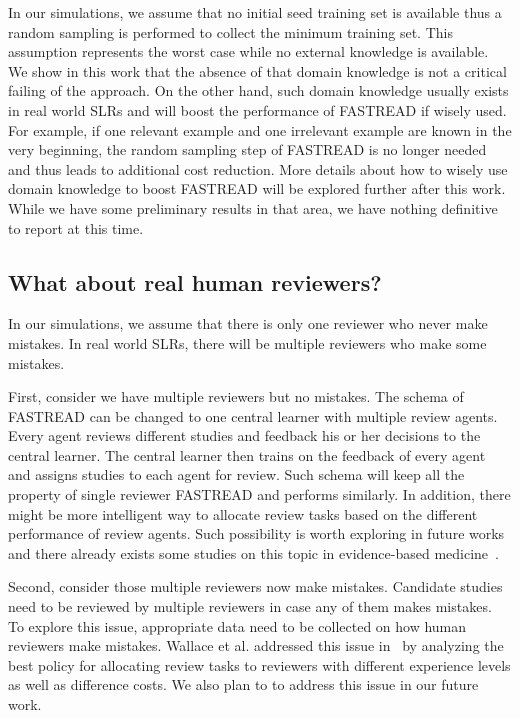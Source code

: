 \documentclass{svjour3}
\theoremstyle{break}
\begin{document}
In our simulations, we assume that no initial seed training set is available thus a random sampling is performed to collect the minimum training set. This assumption represents the worst case while no external knowledge is available. We show in this work that the absence of that domain knowledge is not a critical failing of the approach. On the other hand, such domain knowledge usually exists in real world SLRs and will boost the performance of FASTREAD if wisely used. For example, if one relevant example and one irrelevant example are known in the very beginning, the random sampling step of FASTREAD is no longer needed and thus leads to additional cost reduction. More details about how to wisely use domain knowledge to boost FASTREAD will be explored further after this work. While we have some preliminary results in that area, we have nothing definitive to report at this time.

\subsection{What about real human reviewers?}

In our simulations, we assume that there is only one reviewer who never make mistakes. In real world SLRs, there will be multiple reviewers who make some mistakes. 

First, consider we have multiple reviewers but no mistakes. The schema of FASTREAD can be changed to one central learner with multiple review agents. Every agent reviews different studies and feedback his or her decisions to the central learner. The central learner then trains on the feedback of every agent and assigns studies to each agent for review. Such schema will keep all the property of single reviewer FASTREAD and performs similarly. In addition, there might be more intelligent way to allocate review tasks based on the different performance of review agents. Such possibility is worth exploring in future works and there already exists some studies on this topic in evidence-based medicine~\cite{wallace2011should}.

Second, consider those multiple reviewers now make mistakes. Candidate studies need to be reviewed by multiple reviewers in case any of them makes mistakes. To explore this issue, appropriate data need to be collected on how human reviewers make mistakes. Wallace et al. addressed this issue in~\cite{nguyen2015combining} by analyzing the best policy for allocating review tasks to reviewers with different experience levels as well as difference costs. We also plan to to address this issue in our future work.
\end{document}
